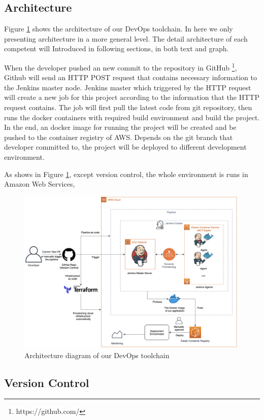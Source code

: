 \subsection{Architecture}
Figure \ref{fig:archjenkins} shows the architecture of our DevOps toolchain. In here we only presenting architecture in a more general level. The detail architecture of each competent will Introduced in following sections, in both text and graph.
\par
When the developer pushed an new commit to the repository in GitHub \footnote{https://github.com/}, Github will send an HTTP POST request that contains necessary information to the Jenkins master node. Jenkins master which triggered by the HTTP request will create a new job for this project according to the information that the HTTP request contains. The job will first pull the latest code from git repository, then runs the docker containers with required build environment and build the project. In the end, an docker image for running the project will be created and be pushed to the container registry of AWS. Depends on the git branch that developer committed to, the project will be deployed to different development environment.
\par
As shows in Figure \ref{fig:archjenkins}, except version control, the whole environment is runs in Amazon Web Services, 
\begin{figure}[h]
    \centering
    \includegraphics[width=0.99\textwidth]{pics/arch-med-jenkins.png}
    \caption{Architecture diagram of our DevOps toolchain}
    \label{fig:archjenkins}
\end{figure}
\subsection{Version Control}

